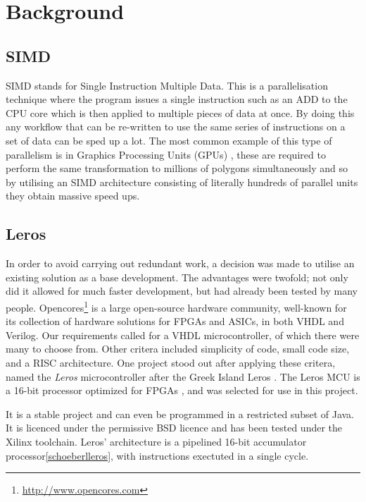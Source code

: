 \section{Background}
\subsection{SIMD}

SIMD stands for Single Instruction Multiple Data.  This is a parallelisation
technique where the program issues a single instruction such as an ADD to the
CPU core which is then applied to multiple pieces of data at once.  By doing
this any workflow that can be re-written to use the same series of instructions
on a set of data can be sped up a lot.  The most common example of this type of
parallelism is in Graphics Processing Units (GPUs)
\cite{Fatahalian:2008:CLG:1400181.1400197}, these are required to perform the
same transformation to millions of polygons simultaneously and so by utilising
an SIMD architecture consisting of literally hundreds of parallel units they
obtain massive speed ups.

\subsection{Leros}
In order to avoid carrying out redundant work, a decision was made to utilise an
existing solution as a base development. The advantages were twofold; not only
did it allowed for much faster development, but had already been tested by many
people. Opencores\footnote{\url{http://www.opencores.com}
}
is a large open-source hardware community, well-known for its collection of hardware solutions for
FPGAs and ASICs, in both VHDL and Verilog. Our requirements called for a VHDL
microcontroller, of which there were many to choose from. Other critera included
simplicity of code, small code size, and a RISC architecture. One project stood out
after applying these critera, named the \emph{Leros} microcontroller after the
Greek Island Leros \cite{schoeberlleros}.  The Leros MCU is a 16-bit
processor optimized for FPGAs \cite{schoeberlleros}, and was selected for use in this
project.

 It is a stable
project and can even be programmed in a restricted subset of Java. It is licenced
under the permissive BSD licence and has been tested under the Xilinx toolchain.
Leros' architecture is a pipelined 16-bit accumulator processor\ref{schoeberlleros},
with instructions exectuted in a single cycle.

